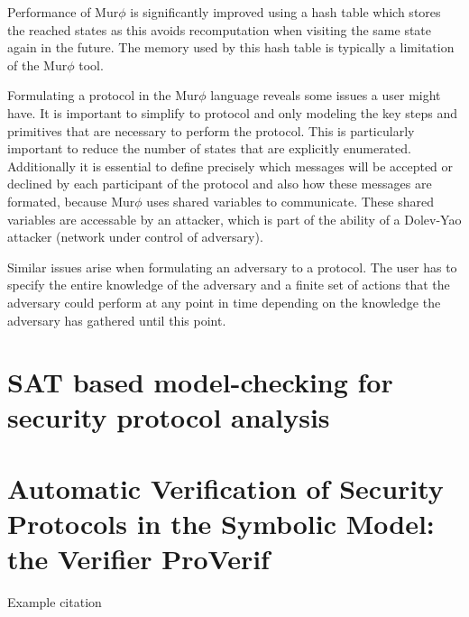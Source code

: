 \documentclass[a4paper,UKenglish]{lipics-v2018}
\def\murphi{Mur$\phi$ }
\begin{document}
Performance of \murphi is significantly improved using a hash table which stores the reached states as this avoids recomputation when visiting the same state again in the future. The memory used by this hash table is typically a limitation of the \murphi tool.\cite{murphi}

Formulating a protocol in the \murphi language reveals some issues a user might have. It is important to simplify to protocol and only modeling the key steps and primitives that are necessary to perform the protocol. This is particularly important to reduce the number of states that are explicitly enumerated. Additionally it is essential to define precisely which messages will be accepted or declined by each participant of the protocol and also how these messages are formated, because \murphi uses shared variables to communicate. These shared variables are accessable by an attacker, which is part of the ability of a Dolev-Yao attacker (network under control of adversary).\cite{murphi}

Similar issues arise when formulating an adversary to a protocol. The user has to specify the entire knowledge of the adversary and a finite set of actions that the adversary could perform at any point in time depending on the knowledge the adversary has gathered until this point.\cite{murphi}






\newpage
\section{SAT based model-checking for security protocol analysis}



\newpage
\section{Automatic Verification of Security Protocols in the Symbolic Model: the Verifier ProVerif}
Example citation \cite{ProVerif}




\end{document}
